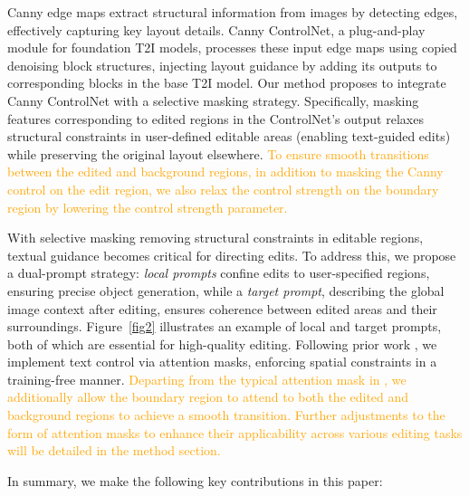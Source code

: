 \documentclass{article}
\begin{document}
Canny edge maps \citep{canny1986computational} extract structural information from images by detecting edges, effectively capturing key layout details. Canny ControlNet, a plug-and-play module for foundation T2I models, processes these input edge maps using copied denoising block structures, injecting layout guidance by adding its outputs to corresponding blocks in the base T2I model. Our method proposes to integrate Canny ControlNet with a selective masking strategy. Specifically, masking features corresponding to edited regions in the ControlNet's output relaxes structural constraints in user-defined editable areas (enabling text-guided edits) while preserving the original layout elsewhere. \textcolor{orange}{To ensure smooth transitions between the edited and background regions, in addition to masking the Canny control on the edit region, we also relax the control strength on the boundary region by lowering the control strength parameter.}


With selective masking removing structural constraints in editable regions, textual guidance becomes critical for directing edits. To address this, we propose a dual-prompt strategy: \emph{local prompts} confine edits to user-specified regions, ensuring precise object generation, while a \emph{target prompt}, describing the global image context after editing, ensures coherence between edited areas and their surroundings. Figure~\ref{fig2} illustrates an example of local and target prompts, both of which are essential for high-quality editing. Following prior work \citep{chen2024training}, we implement text control via attention masks, enforcing spatial constraints in a training-free manner. \textcolor{orange}{Departing from the typical attention mask in \citep{chen2024training}, we additionally allow the boundary region to attend to both the edited and background regions to achieve a smooth transition. Further adjustments to the form of attention masks to enhance their applicability across various editing tasks will be detailed in the method section. }


In summary, we make the following key contributions in this paper:
\end{document}
